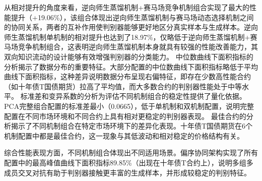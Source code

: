 % 

从相对提升的角度来看，逆向师生蒸馏机制+赛马场竞争机制组合实现了最大的性能提升（+19.06\%），该组合体现出逆向师生蒸馏机制与赛马场动态选择机制之间的协同关系，两者的互补作用使判别器能够更好地区分真实样本与生成样本。逆向师生蒸馏机制单机制的相对提升也达到了18.97\%，仅略低于逆向师生蒸馏机制+赛马场竞争机制组合，这表明逆向师生蒸馏机制本身就具有较强的性能改善能力，其双向知识流动的设计能够有效增强判别器的分类能力。
中位数曲线下面积指标的分析揭示了数据分布的重要特征。大部分配置的中位数曲线下面积指标略低于平均曲线下面积指标，这种差异说明数据分布呈现右偏特征，即存在少数高性能合约（如十年债T国债期货）拉高了平均值，而大多数合约的判别器性能处于中等水平。
标准差和变异系数的分析为评估不同机制组合的稳定性提供了量化依据。PCA完整组合配置的标准差最小（0.0665），低于单机制和双机制配置，说明完整配置在不同市场环境和不同合约上具有相对更稳定的判别器表现。
最佳合约的分析揭示了不同机制组合在特定市场环境下的差异化表现。十年债T国债期货在6个机制配置中都是最佳合约，这一现象与其低波动和相对稳定的价格结构有关。

综合性能表现方面，不同机制组合体现出不同适用场景。偏序协同架构实现了所有配置中的最高峰值曲线下面积指标89.85\%（出现在十年债T合约上），说明多组多成员交叉对抗有助于判别器接触更丰富的生成样本，并形成较稳定的判别特征。

